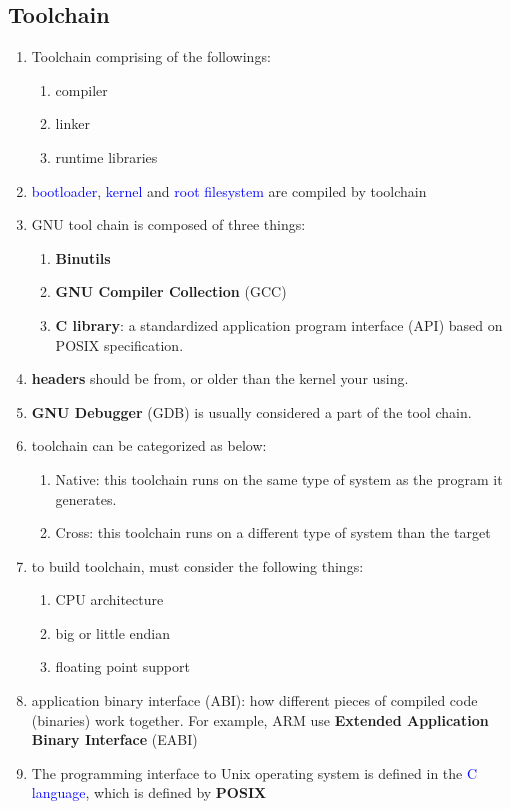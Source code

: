 \documentclass[12pt,a4paper]{article}
\newcommand{\bt}[1]{\textcolor{blue}{#1}}
\begin{document}
\subsection{Toolchain}
\begin{enumerate}
	\item Toolchain comprising of the followings:
	\begin{enumerate}
		\item compiler
		\item linker
		\item runtime libraries
	\end{enumerate}
	\item \bt{bootloader}, \bt{kernel} and \bt{root filesystem} are compiled by toolchain
	\item GNU tool chain is composed of three things:
	\begin{enumerate}
		\item \textbf{Binutils}
		\item \textbf{GNU Compiler Collection} (GCC)
		\item \textbf{C library}: a standardized application program interface (API) based on POSIX specification.
	\end{enumerate}
	\item \textbf{headers} should be from, or older than the kernel your using.
	\item \textbf{GNU Debugger} (GDB) is usually considered a part of the tool chain.
	\item toolchain can be categorized as below:
	\begin{enumerate}
		\item Native: this toolchain runs on the same type of system as the program it generates.
		\item Cross: this toolchain runs on a different type of system than the target
	\end{enumerate}
	\item to build toolchain, must consider the following things:
	\begin{enumerate}
		\item CPU architecture
		\item big or little endian
		\item floating point support
	\end{enumerate}
	\item application binary interface (ABI): how different pieces of compiled code (binaries) work together. For example, ARM use \textbf{Extended Application Binary Interface} (EABI)
	\item The programming interface to Unix operating system is defined in the \bt{C language}, which is defined by \textbf{POSIX}

\end{enumerate}
\end{document}
